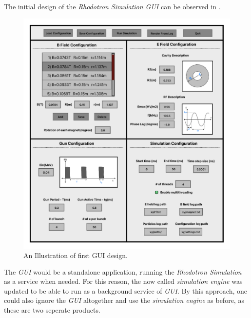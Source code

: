 \documentclass[a4paper,oneside,12pt]{report}
\numberwithin{equation}{chapter}
\begin{document}
The initial design of the \textit{Rhodotron Simulation GUI} can be observed in .

\begin{figure}[H]
    \centering
    \includegraphics[width=\linewidth]{./figures/illustrations/RhodoSim_GUI_Draft_V02.pdf}
    \caption{An Illustration of first GUI design.}
    \label{fig:gui_illustration}
\end{figure}

The \textit{GUI} would be a standalone application, running the \textit{Rhodotron Simulation} as a service when needed. 
For this reason, the now called \textit{simulation engine} was updated to be able to run as a background service of \textit{GUI}.
By this approach, one could also ignore the \textit{GUI} altogether and use the \textit{simulation engine} as before, as these are two seperate products.






\newpage


\appendix
\end{document}
